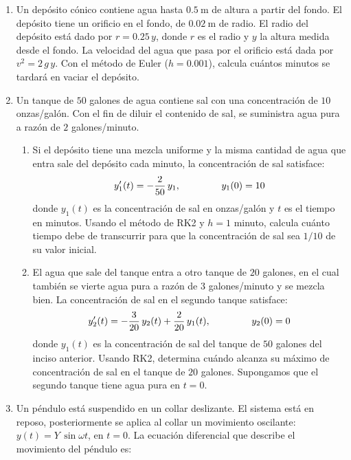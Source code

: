 \begin{enumerate}
\item Un depósito cónico contiene agua hasta $\SI{0.5}{\meter}$ de altura a partir del fondo. El depósito tiene un orificio en el fondo, de $\SI{0.02}{\meter}$ de radio. El radio del depósito está dado por $r = 0.25 \, y$, donde $r$ es el radio y $y$ la altura medida desde el fondo. La velocidad del agua que pasa por el orificio está dada por $v^{2} = 2 \, g \, y$. Con el método de Euler ($h = 0.001$), calcula cuántos minutos se tardará en vaciar el depósito.
\item Un tanque de $50$ galones de agua contiene sal con una concentración de $10$ onzas/galón. Con el fin de diluir el contenido de sal, se suministra agua pura a razón de $2$ galones/minuto.
\begin{enumerate}
\item Si el depósito tiene una mezcla uniforme y la misma cantidad de agua que entra sale del depósito cada minuto, la concentración de sal satisface:
\begin{align*}
{y}^{\prime}_{1} (t) = - \dfrac{2}{50} \, y_{1}, \hspace{1.5cm} y_{1} (0) = 10
\end{align*}
donde $y_{1} (t)$ es la concentración de sal en onzas/galón y $t$ es el tiempo en minutos. Usando el método de RK2 y $h = 1$ minuto, calcula cuánto tiempo debe de transcurrir para que la concentración de sal sea $1/10$ de su valor inicial.
\item El agua que sale del tanque entra a otro tanque de $20$ galones, en el cual también se vierte agua pura a razón de $3$ galones/minuto y se mezcla bien. La concentración de sal en el segundo tanque satisface:
\begin{align*}
{y}^{\prime}_{2} (t)= - \dfrac{3}{20} \, y_{2} (t)+ \dfrac{2}{20} \, y_{1} (t), \hspace{1.5cm} y_{2}(0) = 0
\end{align*}
donde $y_{1} (t)$ es la concentración de sal del tanque de $50$ galones del inciso anterior. Usando RK2, determina cuándo alcanza su máximo de concentración de sal en el tanque de $20$ galones. Supongamos que el segundo tanque tiene agua pura en $t = 0$.
\end{enumerate}
\item Un péndulo está suspendido en un collar deslizante. El sistema está en reposo, posteriormente se aplica al collar un movimiento oscilante: $y (t) = Y \, \sin \omega t$, en $t = 0$. La ecuación diferencial que describe el movimiento del péndulo es:

\end{enumerate}
